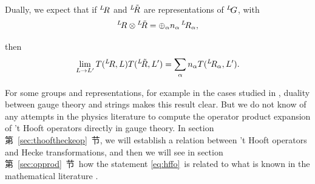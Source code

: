 Dually, we expect that if $^L\negthinspace R$ and
$^L\negthinspace{\tilde R}$ are representations of
$^L\negthinspace G$, with %
\setcounter{equation}{27}
\begin{equation}\label{eq:itro}
^L\negthinspace R\otimes{}
^L\negthinspace\tilde R=\oplus_\alpha n_\alpha\, {}^L\negthinspace R_\alpha,
\end{equation}

then %
\setcounter{equation}{28}
\begin{equation}\label{eq:hffo}
\lim_{L\to L'}T({}^L\negthinspace
R,L)T({}^L\negthinspace\tilde R,L')=\sum_\alpha n_\alpha T({}^L\negthinspace
R_\alpha,L').
\end{equation}

For some groups and representations, for example
in the cases studied in \cite{ref86,ref87}, duality between gauge
theory and strings makes this result clear.  But
we do not know of any attempts in the physics literature to
compute the operator product expansion of 't Hooft operators
directly in gauge theory.  In section 第~\ref{sec:thooftheckeop}~节, we will
establish a relation between 't Hooft operators and Hecke
transformations, and then we will see in section 第~\ref{sec:opprod}~节\ how the
statement \eqref{eq:hffo}\ is related to what is known in the mathematical literature \cite{ref97,ref98}.

